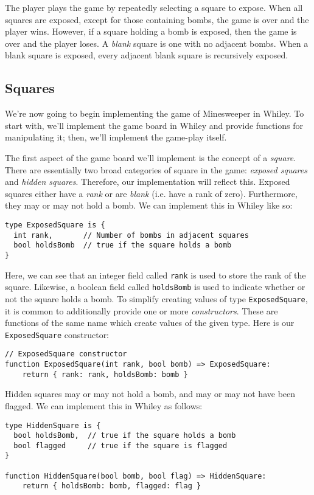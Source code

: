 The player plays the game by repeatedly selecting a square to expose.  When all squares are exposed, except for those containing bombs, the game is over and the player wins.  However, if a square holding a bomb is exposed, then the game is over and the player loses.  A {\em blank} square is one with no adjacent bombs.  When a blank square is exposed, every adjacent blank square is recursively exposed.

\subsection{Squares}
We're now going to begin implementing the game of Minesweeper in Whiley.  To start with, we'll implement the game board in Whiley and provide functions for manipulating it; then, we'll implement the game-play itself.  

The first aspect of the game board we'll implement is the concept of a {\em square}.  There are essentially two broad categories of square in the game: {\em exposed squares} and {\em hidden squares}.  Therefore, our implementation will reflect this.  Exposed squares either have a {\em rank} or are {\em blank} (i.e. have a rank of zero).  Furthermore, they may or may not hold a bomb.  We can implement this in Whiley like so:
\begin{lstlisting}
type ExposedSquare is { 
  int rank,       // Number of bombs in adjacent squares
  bool holdsBomb  // true if the square holds a bomb
}
\end{lstlisting}
Here, we can see that an integer field called \lstinline{rank} is used to store the rank of the square.  Likewise, a boolean field called \lstinline{holdsBomb} is used to indicate whether or not the square holds a bomb.  To simplify creating values of type \lstinline{ExposedSquare}, it is common to additionally provide one or more {\em constructors}.  These are functions of the same name which create values of the given type.  Here is our \lstinline{ExposedSquare} constructor:

\begin{lstlisting}
// ExposedSquare constructor
function ExposedSquare(int rank, bool bomb) => ExposedSquare:
    return { rank: rank, holdsBomb: bomb }
\end{lstlisting}


Hidden squares may or may not hold a bomb, and may or may not have been flagged.  We can implement this in Whiley as follows:

\begin{lstlisting}
type HiddenSquare is { 
  bool holdsBomb,  // true if the square holds a bomb
  bool flagged     // true if the square is flagged
}

function HiddenSquare(bool bomb, bool flag) => HiddenSquare:
    return { holdsBomb: bomb, flagged: flag }
\end{lstlisting}


